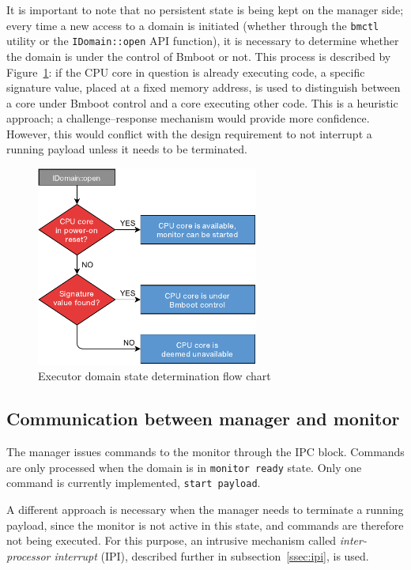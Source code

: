 It is important to note that no persistent state is being kept on the manager side; every time a new access to a domain is initiated (whether through the \texttt{bmctl} utility or the \texttt{IDomain::open} API function), it is necessary to determine whether the domain is under the control of Bmboot or not. This process is described by Figure~\ref{fig:state-determination}: if the CPU core in question is already executing code, a specific signature value, placed at a fixed memory address, is used to distinguish between a core under Bmboot control and a core executing other code. This is a heuristic approach; a challenge--response mechanism would provide more confidence. However, this would conflict with the design requirement to not interrupt a running payload unless it needs to be terminated.

\begin{figure}[h]
  \centering
  \includegraphics[width=0.65\textwidth]{images/state-determination.pdf}
  \caption{Executor domain state determination flow chart \label{fig:state-determination}}
\end{figure}

\subsection{Communication between manager and monitor}

The manager issues commands to the monitor through the IPC block. Commands are only processed when the domain is in \texttt{monitor ready} state. Only one command is currently implemented, \texttt{start payload}.

A different approach is necessary when the manager needs to terminate a running payload, since the monitor is not active in this state, and commands are therefore not being executed. For this purpose, an intrusive mechanism called \textit{inter-processor interrupt} (IPI), described further in subsection~\ref{ssec:ipi}, is used.

